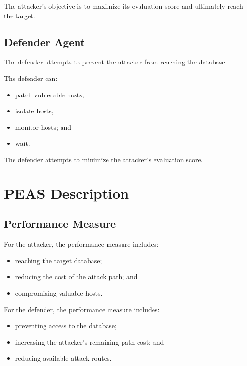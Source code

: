 \documentclass[12pt,a4paper]{article}
\begin{document}
The attacker's objective is to maximize its evaluation score and ultimately
reach the target.

\subsection{Defender Agent}

The defender attempts to prevent the attacker from reaching the database.

The defender can:

\begin{itemize}
    \item patch vulnerable hosts;
    \item isolate hosts;
    \item monitor hosts; and
    \item wait.
\end{itemize}

The defender attempts to minimize the attacker's evaluation score.


\section{PEAS Description}

\subsection{Performance Measure}

For the attacker, the performance measure includes:

\begin{itemize}
    \item reaching the target database;
    \item reducing the cost of the attack path; and
    \item compromising valuable hosts.
\end{itemize}

For the defender, the performance measure includes:

\begin{itemize}
    \item preventing access to the database;
    \item increasing the attacker's remaining path cost; and
    \item reducing available attack routes.
\end{itemize}
\end{document}
